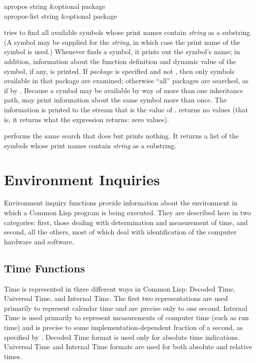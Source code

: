 \begin{defun}[Function]
apropos string &optional package \\
apropos-list string &optional package

 tries to find all available symbols whose print names
contain {\it string} as a substring.  (A symbol may be supplied for
the {\it string}, in which case the print name of the symbol is used.)
Whenever  finds a symbol, it prints
out the symbol's name; in addition,
information about the function definition and dynamic value of the symbol,
if any, is printed.
If {\it package} is specified and not {\nil}, then only symbols
available in that package are examined;
otherwise ``all'' packages are searched, as if by .
Because a symbol may be available by way of more than one inheritance
path,  may print information about the same symbol more than once.
The information is printed to the stream that is the value
of .
 returns no values (that is, it returns what the expression
 returns: zero values).

 performs the same search that  does but
prints nothing.  It returns a list of the symbols whose print names
contain {\it string} as a substring.
\end{defun}

\section{Environment Inquiries}

Environment inquiry functions provide information about the
environment in which a Common Lisp program is being executed.
They are described here in two categories: first, those dealing with
determination and measurement of time, and second, all the others,
most of which deal with identification of the computer hardware
and software.

\subsection{Time Functions}
\label{TIME-SECTION}

Time is represented in three different ways in Common Lisp:
Decoded Time, Universal Time, and Internal Time.
The first two representations
are used primarily to represent calendar time and are
precise only to one second.
Internal Time is used primarily to represent measurements of computer
time (such as run time) and is precise to some implementation-dependent
fraction of a second, as specified by .
Decoded Time format is used only for absolute time indications.
Universal Time and Internal Time formats are used for both absolute
and relative times.

